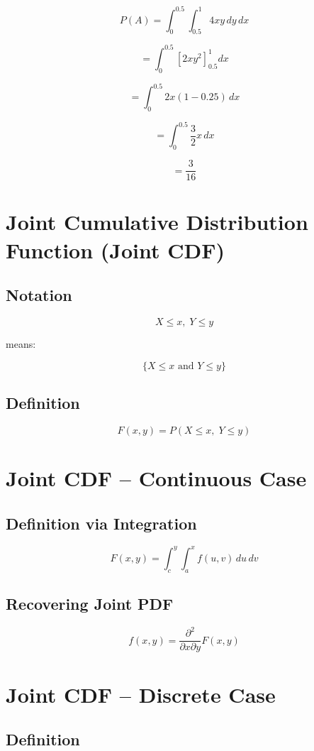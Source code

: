 \documentclass[12pt]{article}
\begin{document}
\[
P(A) = \int_0^{0.5} \int_{0.5}^{1} 4xy\, dy\, dx
\]

\[
= \int_0^{0.5} \left[2x y^2\right]_{0.5}^{1} dx
\]

\[
= \int_0^{0.5} 2x(1 - 0.25)\, dx
\]

\[
= \int_0^{0.5} \frac{3}{2}x\, dx
\]

\[
= \frac{3}{16}
\]

\section{Joint Cumulative Distribution Function (Joint CDF)}

\subsection{Notation}

\[
X \le x, \; Y \le y
\]

means:

\[
\{X \le x \text{ and } Y \le y\}
\]

\subsection{Definition}

\[
F(x,y) = P(X \le x, \; Y \le y)
\]

\section{Joint CDF -- Continuous Case}

\subsection{Definition via Integration}

\[
F(x,y) = \int_c^y \int_a^x f(u,v)\, du\, dv
\]

\subsection{Recovering Joint PDF}

\[
f(x,y) = \frac{\partial^2}{\partial x \partial y} F(x,y)
\]

\section{Joint CDF -- Discrete Case}

\subsection{Definition}
\end{document}
